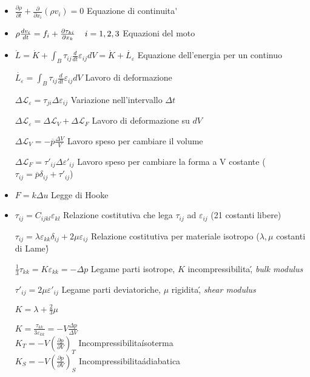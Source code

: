 \documentclass[a4paper]{article}
\begin{document}
\begin{itemize}
	\item $\frac{\partial \rho}{\partial t}+\frac{\partial}{\partial x_i}(\rho v_i)=0$ Equazione di continuita\'
	
	\item $\rho \frac{d v_i}{dt}=f_i+\frac{\partial \tau_{ki}}{\partial x_k} \hspace{0.4cm} i=1,2,3$ Equazioni del moto
	
	\item $\dot{L}=\dot{K}+\int_{B} \tau_{ij} \frac{d}{dt}$$\varepsilon_{ij}dV=\dot{K}+\dot{L_\varepsilon}$ Equazione dell'energia per un continuo
	
	$\dot{L_\varepsilon}=\int_{B} \tau_{ij} \frac{d}{dt}$$\varepsilon_{ij}dV$ Lavoro di deformazione
	
	$\Delta \mathcal{L}_\varepsilon= \tau_{ji}\Delta \varepsilon_{ij}$ Variazione nell'intervallo $\Delta t$
	
	$\Delta \mathcal{L}_\varepsilon = \Delta \mathcal{L}_V + \Delta \mathcal{L}_F$ Lavoro di deformazione su $dV$
	
	$\Delta \mathcal{L}_V=-\overline{p} \frac{\Delta V}{V}$ Lavoro speso per cambiare il volume
	
	$\Delta \mathcal{L}_F = \tau'_{ij} \Delta \varepsilon'_{ij}$ Lavoro speso per cambiare la forma a V costante ($\tau_{ij}=\overline{p}\delta_{ij}+\tau'_{ij}$)
	
	\item $F = k \Delta u$ Legge di Hooke
	
	\item $\tau_{ij}=C_{ijkl} \varepsilon_{kl}$ Relazione costitutiva che lega $\tau_{ij}$ ad $\varepsilon_{ij}$ (21 costanti libere)
	
	$\tau_{ij}= \lambda \varepsilon_{kk} \delta_{ij}+2 \mu \varepsilon_{ij}$ Relazione costitutiva per materiale isotropo ($\lambda, \mu$ costanti di Lame\')
	
	$\frac{1}{3}\tau_{kk} = K \varepsilon_{kk}=-\Delta p$ Legame parti isotrope, $K$ incompressibilita\', \textit{bulk modulus}
	
	$\tau'_{ij}=2 \mu \varepsilon'_{ij}$ Legame parti deviatoriche, $\mu$ rigidita\', \textit{shear modulus}
	
	$K=\lambda + \frac{2}{3}\mu$
	
	$K=\frac{\tau_{kk}}{3\varepsilon_{kk}}=-V\frac{\Delta p}{\Delta V}$\\
	$K_T=-V(\frac{\partial p}{\partial V})_T$ Incompressibilita\' isoterma\\
	$K_S=-V(\frac{\partial p}{\partial V})_S$ Incompressibilita\' adiabatica
	

\end{itemize}
\end{document}
